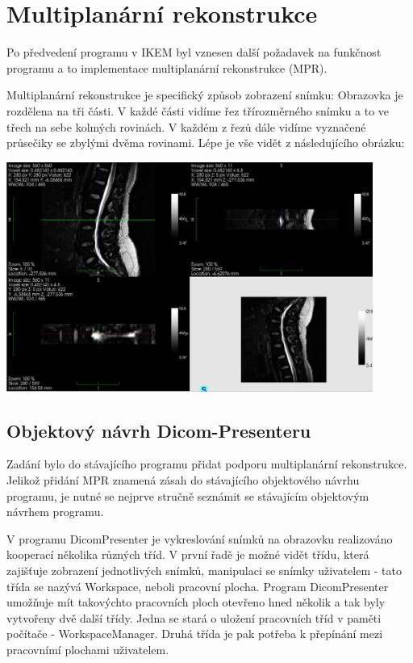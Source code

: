 \section{Multiplanární rekonstrukce}
Po předvedení programu v IKEM byl vznesen další požadavek na funkčnost programu a to implementace multiplanární rekonstrukce (MPR).

Multiplanární rekonstrukce je specifický způsob zobrazení snímku: Obrazovka je rozdělena na tři části. V každé části vidíme řez třírozměrného snímku a to ve třech na sebe kolmých rovinách. V každém z řezů dále vidíme vyznačené průsečiky se zbylými dvěma rovinami. Lépe je vše vidět z následujícího obrázku:

\includegraphics[width=0.9\textwidth,height=0.9\textwidth]{Text/IMG/MPR_Medinria.jpg}

\subsection{Objektový návrh Dicom-Presenteru}
Zadání bylo do stávajícího programu přidat podporu multiplanární rekonstrukce. Jelikož přidání MPR znamená zásah do stávajícího objektového návrhu programu, je nutné se nejprve stručně seznámit se stávajícím objektovým návrhem programu.

V programu DicomPresenter je vykreslování snímků na obrazovku realizováno kooperací několika různých tříd. V první řadě je možné vidět třídu, která zajišťuje zobrazení jednotlivých snímků, manipulaci se snímky uživatelem - tato třída se nazývá Workspace, neboli pracovní plocha. Program DicomPresenter umožňuje mít takovýchto pracovních ploch otevřeno hned několik a tak byly vytvořeny dvě další třídy. Jedna se stará o uložení pracovních tříd v paměti počítače - WorkspaceManager. Druhá třída je pak potřeba k přepínání mezi pracovnímí plochami uživatelem.

